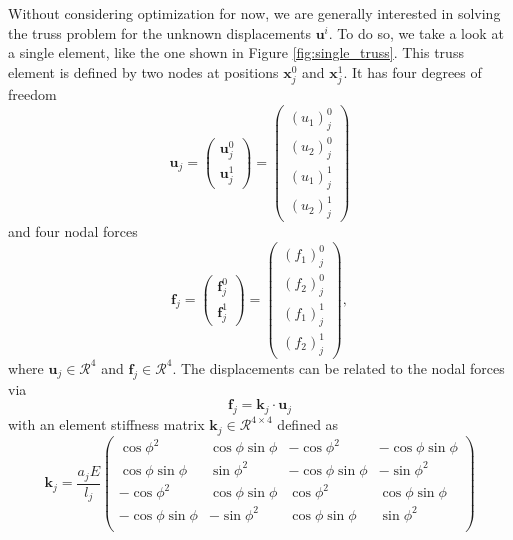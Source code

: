 Without considering optimization for now, we are generally interested in solving the truss problem for the unknown displacements $\mathbf{u}^i$. To do so, we take a look at a single element, like the one shown in Figure \ref{fig:single_truss}. This truss element is defined by two nodes at positions $\mathbf{x}^0_j$ and $\mathbf{x}^1_j$. It has four degrees of freedom 
\begin{equation}
    \mathbf{u}_j = 
    \begin{pmatrix}
        \mathbf{u}^0_j \\  \mathbf{u}^1_j
    \end{pmatrix}
    = 
    \begin{pmatrix}
        (u_1)^0_j \\ (u_2)^0_j \\  (u_1)^1_j \\ (u_2)^1_j
    \end{pmatrix}
\end{equation} 
and four nodal forces 
\begin{equation}
    \mathbf{f}_j = 
    \begin{pmatrix}
        \mathbf{f}^0_j \\  \mathbf{f}^1_j
    \end{pmatrix}
    = 
    \begin{pmatrix}
        (f_1)^0_j\\ (f_2)^0_j\\ (f_1)^1_j \\ (f_2)^1_j
    \end{pmatrix},
\end{equation} 
where $\mathbf{u}_j \in \mathcal{R}^4$ and $\mathbf{f}_j \in \mathcal{R}^4$. 
The displacements can be related to the nodal forces via 
\begin{equation}
    \mathbf{f}_j = \mathbf{k}_j \cdot \mathbf{u}_j
    \label{eq:local_truss_stiffness}
\end{equation}
with an element stiffness matrix $\mathbf{k}_j \in \mathcal{R}^{4\times4}$ defined as \cite{Christensen2008}
\begin{equation}
    \mathbf{k}_j = \frac{a_j E}{l_j}
    \begin{pmatrix}
    \cos{\phi}^2 & \cos{\phi}\sin{\phi} & -\cos{\phi}^2 & -\cos{\phi}\sin{\phi} \\
    \cos{\phi}\sin{\phi} & \sin{\phi}^2 & -\cos{\phi}\sin{\phi} & -\sin{\phi}^2 \\
    -\cos{\phi}^2 & \cos{\phi}\sin{\phi} & \cos{\phi}^2 &\cos{\phi}\sin{\phi} \\
    -\cos{\phi}\sin{\phi} & -\sin{\phi}^2 & \cos{\phi}\sin{\phi} & \sin{\phi}^2 \\
    \end{pmatrix}
\end{equation}

